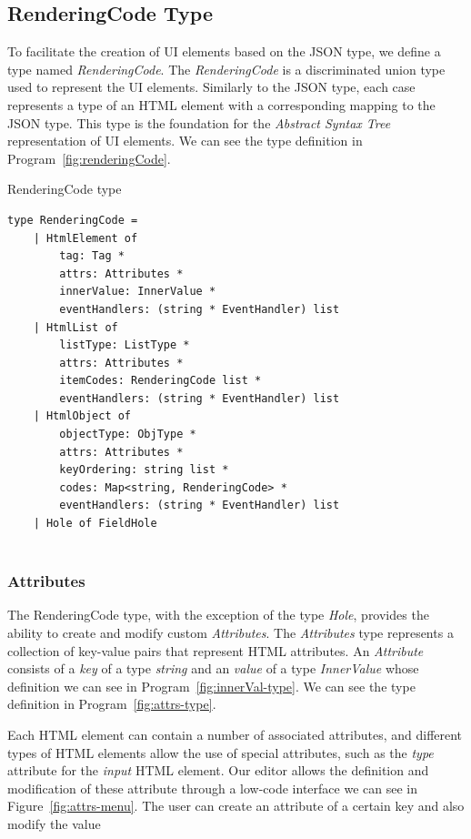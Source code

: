 \subsection{RenderingCode Type}
To facilitate the creation of UI elements based on the JSON type, we define a type named \emph{RenderingCode}.
The \emph{RenderingCode} is a discriminated union type used to represent the UI elements.
Similarly to the JSON type, each case represents a type of an HTML element with a corresponding mapping to the JSON type.
This type is the foundation for the \emph{Abstract Syntax Tree} representation of UI elements.
We can see the type definition in Program~\ref{fig:renderingCode}.
\begin{listing}[htbp]
	\caption {RenderingCode type}
	\label{fig:renderingCode}
	\begin{lstlisting}
type RenderingCode =
    | HtmlElement of 
        tag: Tag * 
        attrs: Attributes * 
        innerValue: InnerValue * 
        eventHandlers: (string * EventHandler) list
    | HtmlList of
        listType: ListType *
        attrs: Attributes *
        itemCodes: RenderingCode list *
        eventHandlers: (string * EventHandler) list
    | HtmlObject of
        objectType: ObjType *
        attrs: Attributes *
        keyOrdering: string list *
        codes: Map<string, RenderingCode> *
        eventHandlers: (string * EventHandler) list
    | Hole of FieldHole
 
  \end{lstlisting}
\end{listing}

\subsubsection{Attributes}
The RenderingCode type, with the exception of the type \emph{Hole}, provides the ability to create and modify custom \emph{Attributes}.
The \emph{Attributes} type represents a collection of key-value pairs that represent HTML attributes.
An \emph{Attribute} consists of a \emph{key} of a type \emph{string} and an \emph{value} of a type \emph{InnerValue} whose definition we can see in Program~\ref{fig:innerVal-type}.
We can see the type definition in Program~\ref{fig:attrs-type}.

Each HTML element can contain a number of associated attributes, and different types of HTML elements allow the use of special attributes, such as the \emph{type} attribute for the \emph{input} HTML element.
Our editor allows the definition and modification of these attribute through a low-code interface we can see in Figure~\ref{fig:attrs-menu}.
The user can create an attribute of a certain key and also modify the value

